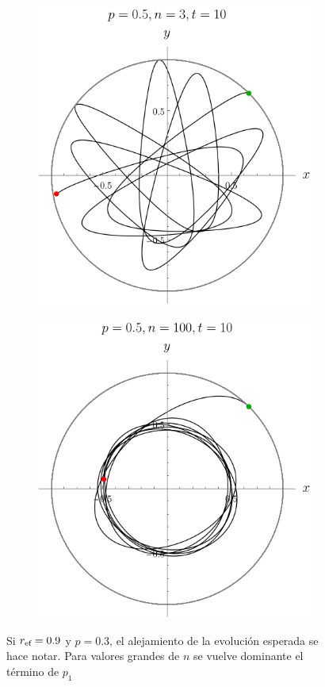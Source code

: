 \begin{figure}[ht!]
    \centering
    \begin{subfigure}{0.5\textwidth}
      \centering
      \includegraphics[width=0.9\linewidth]{chapter3/figures_separable/local_Z_evol_n=3_p=0.5_from_-3_to_3_end=10.png}
    \end{subfigure}%
    \begin{subfigure}{0.5\textwidth}
      \centering
      \includegraphics[width=0.9\linewidth]{chapter3/figures_separable/local_Z_evol_n=100_p=0.5_from_-3_to_3_end=10.png}
    \end{subfigure}
    \caption{Si $r_{\text{ef}}=0.9$ y $p=0.3$, el alejamiento de la evolución esperada se hace notar. Para valores grandes de $n$ se vuelve dominante el término de $p_{1}$}\label{fig:Oscilations13}
\end{figure}

\newpage

\pagebreak